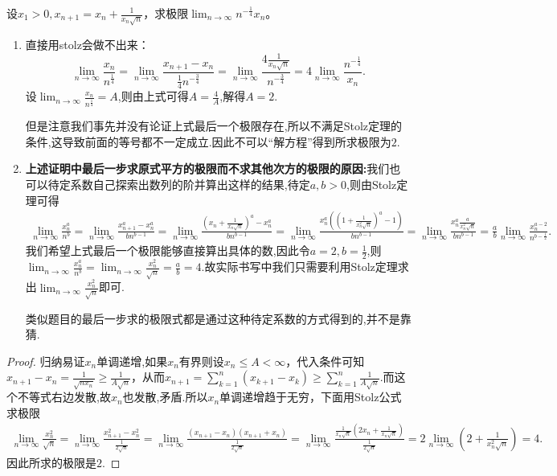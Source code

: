 \documentclass[../../main.tex]{subfiles}%
\begin{document}
\begin{example}\label{example4.47231}
设\(x_1 > 0,x_{n + 1}=x_n+\frac{1}{x_n\sqrt{n}}\)，求极限\(\lim_{n\rightarrow\infty}n^{-\frac{1}{4}}x_n\)。
\end{example}
\begin{note}
\begin{enumerate}
\item 直接用stolz会做不出来：
\[
\lim_{n\rightarrow \infty} \frac{x_n}{n^{\frac{1}{4}}}=\lim_{n\rightarrow \infty} \frac{x_{n+1}-x_n}{\frac{1}{4}n^{-\frac{3}{4}}}=\lim_{n\rightarrow \infty} \frac{4\frac{1}{x_n\sqrt{n}}}{n^{-\frac{3}{4}}}=4\lim_{n\rightarrow \infty} \frac{n^{-\frac{1}{4}}}{x_n}.
\]
设$\lim_{n\rightarrow \infty} \frac{x_n}{n^{\frac{1}{4}}}=A$,则由上式可得$A=\frac{4}{A}$,解得$A=2$.

但是注意我们事先并没有论证上式最后一个极限存在,所以不满足Stolz定理的条件,这导致前面的等号都不一定成立.因此不可以“解方程”得到所求极限为\(2\).

\item \textbf{上述证明中最后一步求原式平方的极限而不求其他次方的极限的原因:}我们也可以待定系数自己探索出数列的阶并算出这样的结果,待定$a,b>0$,则由Stolz定理可得
\begin{align*}
\lim_{n\rightarrow \infty} \frac{x_{n}^{a}}{n^b}=\lim_{n\rightarrow \infty} \frac{x_{n+1}^{a}-x_{n}^{a}}{bn^{b-1}}=\lim_{n\rightarrow \infty} \frac{\left( x_n+\frac{1}{x_n\sqrt{n}} \right) ^a-x_{n}^{a}}{bn^{b-1}}=\lim_{n\rightarrow \infty} \frac{x_{n}^{a}\left( \left( 1+\frac{1}{x_{n}^{2}\sqrt{n}} \right) ^a-1 \right)}{bn^{b-1}}
=\lim_{n\rightarrow \infty} \frac{x_{n}^{a}\frac{a}{x_{n}^{2}\sqrt{n}}}{bn^{b-1}}=\frac{a}{b}\lim_{n\rightarrow \infty} \frac{x_{n}^{a-2}}{n^{b-\frac{1}{2}}}.
\end{align*}
我们希望上式最后一个极限能够直接算出具体的数,因此令$a=2,b=\frac{1}{2}$,则$\lim_{n\rightarrow \infty} \frac{x_{n}^{a}}{n^b}=\lim_{n\rightarrow \infty} \frac{x_{n}^{2}}{\sqrt{n}}=\frac{a}{b}=4$.故实际书写中我们只需要利用Stolz定理求出\(\lim_{n\rightarrow\infty}\frac{x_n^{2}}{\sqrt{n}}\)即可.

类似题目的最后一步求的极限式都是通过这种待定系数的方式得到的,并不是靠猜.
\end{enumerate}
\end{note}
\begin{proof}
归纳易证\(x_n\)单调递增,如果\(x_n\)有界则设\(x_n\leqslant  A<\infty\)，代入条件可知\(x_{n + 1}-x_n=\frac{1}{\sqrt{nx_n}}\geqslant \frac{1}{A\sqrt{n}}\)，从而$x_{n+1}=\sum_{k=1}^n{\left( x_{k+1}-x_k \right)}\geqslant \sum_{k=1}^n{\frac{1}{A\sqrt{n}}}$.而这个不等式右边发散,故$x_n$也发散,矛盾.所以\(x_n\)单调递增趋于无穷，下面用Stolz公式求极限
\begin{align*}
\lim_{n\rightarrow \infty} \frac{x_{n}^{2}}{\sqrt{n}}=\lim_{n\rightarrow \infty} \frac{x_{n+1}^{2}-x_{n}^{2}}{\frac{1}{2\sqrt{n}}}=\lim_{n\rightarrow \infty} \frac{\left( x_{n+1}-x_n \right) \left( x_{n+1}+x_n \right)}{\frac{1}{2\sqrt{n}}}=\lim_{n\rightarrow \infty} \frac{\frac{1}{x_n\sqrt{n}}\left( 2x_n+\frac{1}{x_n\sqrt{n}} \right)}{\frac{1}{2\sqrt{n}}}=2\lim_{n\rightarrow \infty} \left( 2+\frac{1}{x_{n}^{2}\sqrt{n}} \right) =4.
\end{align*}
因此所求的极限是\(2\).
\end{proof}
\end{document}
